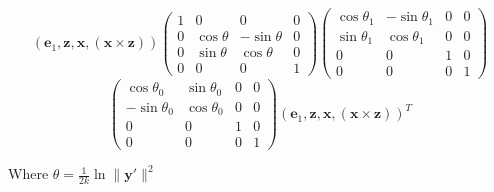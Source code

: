 \documentclass[12pt]{amsart}
\begin{document}
$$(\textbf{e}_1,\textbf{z},\textbf{x},(\textbf{x} \times \textbf{z}))
\left(\begin{array}{cccc} 1 & 0 & 0 & 0 \\ 0 & \cos\theta & -\sin\theta & 0 \\ 0 & \sin\theta & \cos\theta & 0 \\ 0 & 0 & 0 & 1 \end{array} \right)
\left(\begin{array}{cccc} \cos\theta_1 & -\sin\theta_1 & 0 & 0 \\ \sin\theta_1 & \cos\theta_1 & 0 & 0 \\ 0 & 0 & 1 & 0 \\ 0 & 0 & 0 & 1 \end{array} \right)$$ $$
\left(\begin{array}{cccc} \cos\theta_0 & \sin\theta_0 & 0 & 0 \\ -\sin\theta_0 & \cos\theta_0 & 0 & 0 \\ 0 & 0 & 1 & 0 \\ 0 & 0 & 0 & 1 \end{array} \right)
(\textbf{e}_1,\textbf{z},\textbf{x},(\textbf{x} \times \textbf{z}))^T$$

Where $\theta = \frac{1}{2k}\ln\|\textbf{y}'\|^2$
\end{document}
